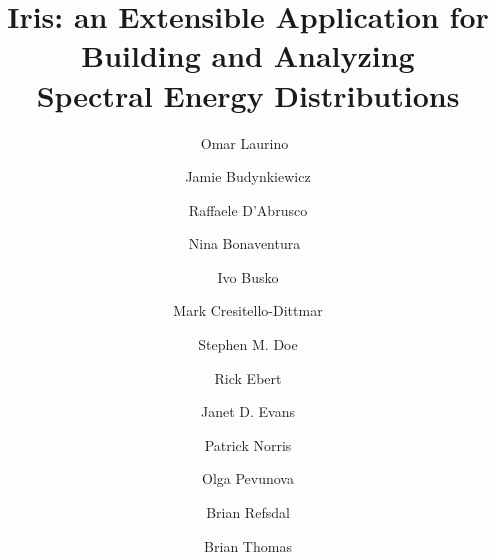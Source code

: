\documentclass[final,5p]{elsarticle}
\begin{document}
\begin{frontmatter}



\title{Iris: an Extensible Application for Building and Analyzing\\
Spectral Energy Distributions}

\author[sao]{Omar Laurino~}

\author[sao]{Jamie Budynkiewicz}

\author[sao]{Raffaele D'Abrusco}

\author[sao]{Nina Bonaventura~}

\author[stsci]{Ivo Busko}

\author[sao]{Mark Cresitello-Dittmar}

\author[sao]{Stephen M. Doe}

\author[ipac]{Rick Ebert}

\author[sao]{Janet D. Evans}

\author[noao]{Patrick Norris}

\author[ipac]{Olga Pevunova}

\author[sao]{Brian Refsdal}

\author[noao]{Brian Thomas}


\end{frontmatter}
\end{document}
